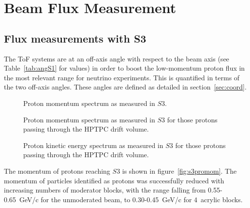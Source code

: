 \section{Beam Flux Measurement}
\label{hptpcPaper:sec:Results}

\subsection{Flux measurements with S3}

The ToF systems are at an off-axis angle with respect to the beam axis (see Table~\ref{tab:angS1} for values) in order to boost the low-momentum proton flux in the most relevant range for neutrino experiments.
This is quantified in terms of the two off-axis angles.
These angles are defined as detailed in section~\ref{sec:coord}.

\begin{figure}[ht]
  \centering
  \begin{minipage}[t]{0.49\textwidth}
    \begin{adjustbox}{max totalsize={\textwidth}, center}
      
    \end{adjustbox}
    \caption{Proton momentum spectrum as measured in $\mathit{S3}$.}
    \label{fig:s3promom}
  \end{minipage}
  \hfill
  \begin{minipage}[t]{0.49\textwidth}
    \begin{adjustbox}{max totalsize={\textwidth}, center}
      
    \end{adjustbox}
    \caption{Proton momentum spectrum as measured in $\mathit{S3}$ for those protons passing through the HPTPC drift volume.}
    \label{fig:tpcpromom}
  \end{minipage}
\end{figure}

\begin{figure}[ht]
  \centering
  \begin{adjustbox}{max totalsize={0.5\textwidth}, center}
      
  \end{adjustbox}
  \caption{Proton kinetic energy spectrum as measured in $\mathit{S3}$ for those protons passing through the HPTPC drift volume.}
  \label{fig:tpcproke}
\end{figure}

The momentum of protons reaching $\mathit{S3}$ is shown in figure~\ref{fig:s3promom}. 
The momentum of particles identified as protons was successfully reduced with increasing numbers of moderator blocks, with the range falling from 0.55-0.65~GeV/c for the unmoderated beam, to 0.30-0.45~GeV/c for 4~acrylic blocks.

